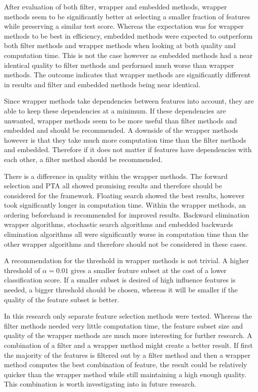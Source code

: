 	After evaluation of both filter, wrapper and embedded methods, wrapper methods seem to be significantly better at selecting a smaller fraction of features while preserving a similar test score.  Whereas the expectation was for wrapper methods to be best in efficiency, embedded methods were expected to outperform both filter methods and wrapper methods when looking at both quality and computation time. This is not the case however as embedded methods had a near identical quality to filter methods and performed much worse than wrapper methods. The outcome indicates that wrapper methods are significantly different in results and filter and embedded methods being near identical.
	
	Since wrapper methods take dependencies between features into account, they are able to keep these dependencies at a minimum. If these dependencies are unwanted, wrapper methods seem to be more useful than filter methods and embedded and should be recommended. A downside of the wrapper methods however is that they take much more computation time than the filter methods and embedded. Therefore if it does not matter if features have dependencies with each other, a filter method should be recommended.
	
	There is a difference in quality within the wrapper methods. The forward selection and PTA all showed promising results and therefore should be considered for the framework. Floating search showed the best results, however took significantly longer in computation time. Within the wrapper methods, an ordering beforehand is recommended for improved results. Backward elimination wrapper algorithms, stochastic search algorithms and embedded backwards elimination algorithms all were significantly worse in computation time than the other wrapper algorithms and therefore should not be considered in these cases.
	
	A recommendation for the threshold in wrapper methods is not trivial. A higher threshold of $\alpha = 0.01$ gives a smaller feature subset at the cost of a lower classification score. If a smaller subset is desired of high influence features is needed, a bigger threshold should be chosen, whereas it will be smaller if the quality of the feature subset is better.
	
	In this research only separate feature selection methods were tested. Whereas the filter methods needed very little computation time, the feature subset size and quality of the wrapper methods are much more interesting for further research. A combination of a filter and a wrapper method might create a better result. If first the majority of the features is filtered out by a filter method and then a wrapper method computes the best combination of feature, the result could be relatively quicker than the wrapper method while still maintaining a high enough quality. This combination is worth investigating into in future research.
	
